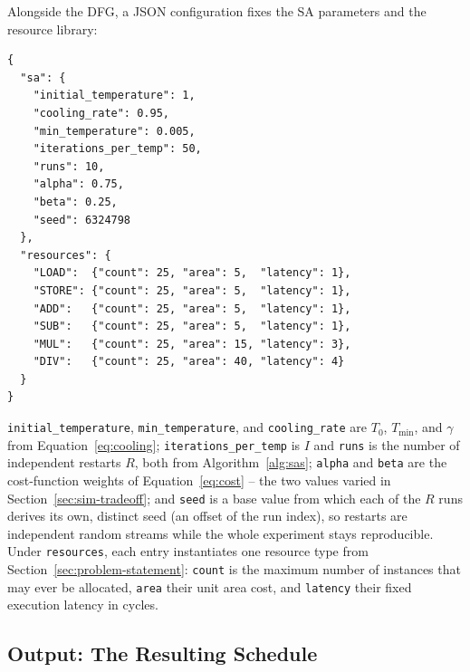 \documentclass[conference]{IEEEtran}
\begin{document}
    Alongside the DFG, a JSON configuration fixes the SA parameters and the resource library:
    \begingroup\fontsize{7}{9}\selectfont
    \begin{verbatim}
{
  "sa": {
    "initial_temperature": 1,
    "cooling_rate": 0.95,
    "min_temperature": 0.005,
    "iterations_per_temp": 50,
    "runs": 10,
    "alpha": 0.75,
    "beta": 0.25,
    "seed": 6324798
  },
  "resources": {
    "LOAD":  {"count": 25, "area": 5,  "latency": 1},
    "STORE": {"count": 25, "area": 5,  "latency": 1},
    "ADD":   {"count": 25, "area": 5,  "latency": 1},
    "SUB":   {"count": 25, "area": 5,  "latency": 1},
    "MUL":   {"count": 25, "area": 15, "latency": 3},
    "DIV":   {"count": 25, "area": 40, "latency": 4}
  }
}
    \end{verbatim}
    \endgroup
    \texttt{initial\_temperature}, \texttt{min\_temperature}, and \texttt{cooling\_rate} are $T_0$,
    $T_{\min}$, and $\gamma$ from Equation~\eqref{eq:cooling}; \texttt{iterations\_per\_temp} is $I$
    and \texttt{runs} is the number of independent restarts $R$, both from
    Algorithm~\ref{alg:sas}; \texttt{alpha} and \texttt{beta} are the cost-function weights of
    Equation~\eqref{eq:cost} -- the two values varied in Section~\ref{sec:sim-tradeoff}; and
    \texttt{seed} is a base value from which each of the $R$ runs derives its own, distinct seed (an
    offset of the run index), so restarts are independent random streams while the whole experiment
    stays reproducible. Under \texttt{resources},
    each entry instantiates one resource type from Section~\ref{sec:problem-statement}: \texttt{count}
    is the maximum number of instances that may ever be allocated, \texttt{area} their unit area cost,
    and \texttt{latency} their fixed execution latency in cycles.

    \subsection{Output: The Resulting Schedule}
    \label{sec:sim-output}
\end{document}
